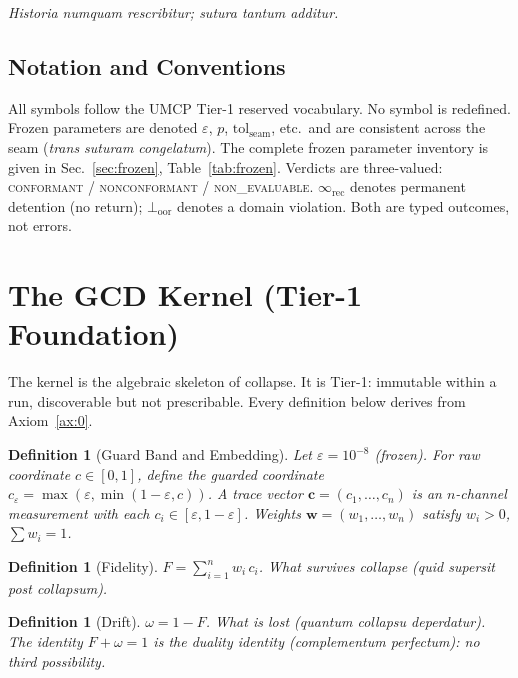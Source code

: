 \documentclass[
  aps,
  prd,
  preprint,
  superscriptaddress,
  nofootinbib,
  floatfix,
  longbibliography
]{revtex4-2}
\newtheorem{definition}[theorem]{Definition}
\newcommand{\eps}{\varepsilon}
\newcommand{\tolseam}{\mathrm{tol}_{\mathrm{seam}}}
\newcommand{\regime}[1]{\textnormal{\textsc{#1}}}
\newcommand{\conform}{\regime{conformant}}
\newcommand{\nonconform}{\regime{nonconformant}}
\newcommand{\tvec}{\mathbf{c}}
\newcommand{\wvec}{\mathbf{w}}
\newcommand{\Fid}{F}
\newcommand{\Drft}{\omega}
\newcommand{\lat}[1]{\textit{#1}}
\begin{document}
\lat{Historia numquam rescribitur; sutura tantum additur.}

\subsection{Notation and Conventions}

All symbols follow the UMCP Tier-1 reserved vocabulary.
No symbol is redefined.
Frozen parameters are denoted $\eps$, $p$, $\tolseam$, etc.\
and are consistent across the seam
(\lat{trans suturam congelatum}).
The complete frozen parameter inventory is given
in Sec.~\ref{sec:frozen}, Table~\ref{tab:frozen}.
Verdicts are three-valued: \conform{} / \nonconform{} /
\regime{non\_evaluable}.
$\infty_{\mathrm{rec}}$ denotes permanent detention
(no return); $\bot_{\mathrm{oor}}$ denotes a domain violation.
Both are typed outcomes, not errors.

\section{The GCD Kernel (Tier-1 Foundation)}\label{sec:kernel}

The kernel is the algebraic skeleton of collapse.
It is Tier-1: immutable within a run, discoverable but
not prescribable. Every definition below derives from
Axiom~\ref{ax:0}.

\begin{definition}[Guard Band and Embedding]\label{def:guard}
Let $\eps = 10^{-8}$ (frozen). For raw coordinate $c \in [0,1]$,
define the guarded coordinate $c_{\eps} = \max(\eps, \min(1-\eps, c))$.
A trace vector $\tvec = (c_1, \ldots, c_n)$ is
an $n$-channel measurement with each $c_i \in [\eps, 1-\eps]$.
Weights $\wvec = (w_1, \ldots, w_n)$ satisfy
$w_i > 0$, $\sum w_i = 1$.
\end{definition}

\begin{definition}[Fidelity]\label{def:F}
$\Fid = \sum_{i=1}^{n} w_i\, c_i$. \quad
What survives collapse (\lat{quid supersit post collapsum}).
\end{definition}

\begin{definition}[Drift]\label{def:omega}
$\Drft = 1 - \Fid$. \quad
What is lost (\lat{quantum collapsu deperdatur}).
The identity $\Fid + \Drft = 1$ is the
\emph{duality identity} (\lat{complementum perfectum}):
no third possibility.
\end{definition}
\end{document}
